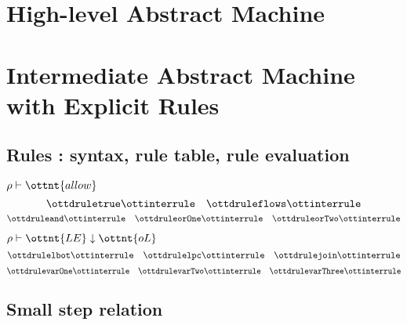 \documentclass{article}
\begin{document}

\newpage
\section*{High-level Abstract Machine}

\ottdefnsAbstractHighLevelSmallStep


\newpage
\section*{Intermediate Abstract Machine
  with Explicit Rules}

\subsection*{Rules : syntax, rule table, rule evaluation}

\ottgrammartabular{
\ottLE\ottinterrule
\ottBE\ottinterrule
\ottRHS\ottinterrule
\ottrho\ottinterrule
}

\ottfundefnsRule

\begin{ottdefnblock}[#1]{$ \rho  \vdash   \ottnt{allow} $}{}
\[ \ottdruletrue \ottinterrule
   \quad \ottdruleflows\ottinterrule \]
\[ \ottdruleand\ottinterrule 
   \quad \ottdruleorOne\ottinterrule
   \quad \ottdruleorTwo\ottinterrule \]
\end{ottdefnblock}

\clearpage
\begin{ottdefnblock}[#1]{$ \rho  \vdash \ottnt{LE} \downarrow  \ottnt{oL} $}{}
\small 
\[ \ottdrulelbot \ottinterrule
   \quad \ottdrulelpc \ottinterrule
   \quad \ottdrulejoin \ottinterrule \]
\[ \ottdrulevarOne \ottinterrule
   \quad \ottdrulevarTwo \ottinterrule
   \quad \ottdrulevarThree \ottinterrule \]
\end{ottdefnblock}

\ottdefnrunXXtmr

\clearpage

\subsection*{Small step relation}
\end{document}
